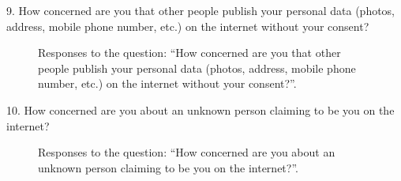 \vspace{2cm}

9. How concerned are you that other people publish your personal data (photos, address, mobile phone number, etc.) on the internet without your consent?

\begin{figure}[H]
    \begin{center}
        \caption*{Responses to the question: ``How concerned are you that other people publish your personal data (photos, address, mobile phone number, etc.) on the internet without your consent?''.}
        \label{fig:survey_s3_q9}
    \end{center}
\end{figure}

10. How concerned are you about an unknown person claiming to be you on the internet?

\begin{figure}[H]
    \begin{center}
        \caption*{Responses to the question: ``How concerned are you about an unknown person claiming to be you on the internet?''.}
        \label{fig:survey_s3_q10}
    \end{center}
\end{figure}

